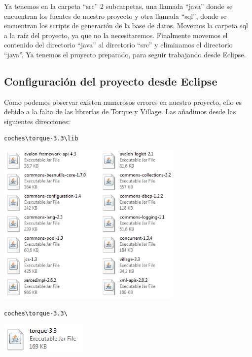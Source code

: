 \documentclass[12pt, oneside]{article}
\begin{document}
Ya tenemos en la carpeta “src” 2 subcarpetas, una llamada “java” donde se encuentran los fuentes de nuestro proyecto y otra llamada “sql”, donde se encuentran los scripts de generación de la base de datos. Movemos la carpeta sql a la raíz del proyecto, ya que no la necesitaremos. Finalmente movemos el contenido del directorio “java” al directorio “src” y eliminamos el directorio “java”. Ya tenemos el proyecto preparado, para seguir trabajando desde Eclipse.

\subsection{Configuración del proyecto desde Eclipse}
Como podemos observar existen numerosos errores en nuestro proyecto, ello es debido a la falta de las librerías de Torque y Village. Las añadimos desde las siguientes direcciones:

\begin{lstlisting}
coches\torque-3.3\lib
\end{lstlisting}

	\begin{center}
		\includegraphics[height=8cm]{img/torque-lib.png}
	\end{center}
	
\begin{lstlisting}
coches\torque-3.3\
\end{lstlisting}

	\begin{center}
		\includegraphics{img/torque-file.png}
	\end{center}
	
\end{document}

